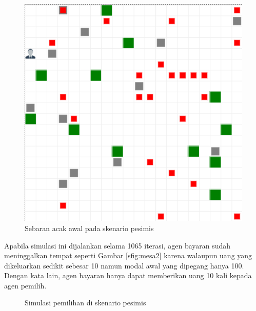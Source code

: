 \begin{figure}[H]
\centering
\includegraphics[width=0.8\linewidth]{images/ch03/mesa1}
\caption{Sebaran acak awal pada skenario pesimis}
\label{fig:mesa1}
\end{figure}

Apabila simulasi ini dijalankan selama 1065 iterasi, agen bayaran sudah meninggalkan tempat seperti Gambar \ref{sfig:mesa2} karena walaupun uang yang dikeluarkan sedikit sebesar 10 namun modal awal yang dipegang hanya 100. Dengan kata lain, agen bayaran hanya dapat memberikan uang 10 kali kepada agen pemilih.

\begin{figure}[H]
	\centering
	\hfill
	\hfill
	\caption{Simulasi pemilihan di skenario pesimis}
	\label{fig:simulasi_mesa_pesimis}
\end{figure}

